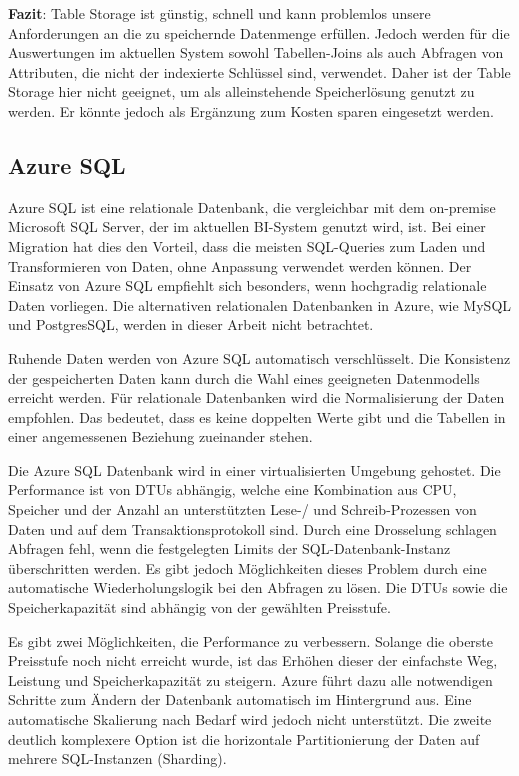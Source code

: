\textbf{Fazit}: Table Storage ist günstig, schnell und kann problemlos unsere Anforderungen an die zu speichernde Datenmenge erfüllen. Jedoch werden für die Auswertungen im aktuellen System sowohl Tabellen-Joins als auch Abfragen von Attributen, die nicht der indexierte Schlüssel sind, verwendet. Daher ist der Table Storage hier nicht geeignet, um als alleinstehende Speicherlösung genutzt zu werden. Er könnte jedoch als Ergänzung zum Kosten sparen eingesetzt werden. \cite[vgl.][]{reagan_web_2018}

\subsection{Azure SQL} \label{sec:grundlagen:azure_dienste:sql}
Azure SQL ist eine relationale Datenbank, die vergleichbar mit dem on-premise Microsoft SQL Server, der im aktuellen BI-System genutzt wird, ist. Bei einer Migration hat dies den Vorteil, dass die meisten SQL-Queries zum Laden und Transformieren von Daten, ohne Anpassung verwendet werden können. Der Einsatz von Azure SQL empfiehlt sich besonders, wenn hochgradig relationale Daten vorliegen. Die alternativen relationalen Datenbanken in Azure, wie MySQL und PostgresSQL, werden in dieser Arbeit nicht betrachtet.

Ruhende Daten werden von Azure SQL automatisch verschlüsselt. Die Konsistenz der gespeicherten Daten kann durch die Wahl eines geeigneten Datenmodells erreicht werden. Für relationale Datenbanken wird die Normalisierung der Daten empfohlen. Das bedeutet, dass es keine doppelten Werte gibt und die Tabellen in einer angemessenen Beziehung zueinander stehen.

Die Azure SQL Datenbank wird in einer virtualisierten Umgebung gehostet. Die Performance ist von DTUs abhängig, welche eine Kombination aus CPU, Speicher und der Anzahl an unterstützten Lese-/ und Schreib-Prozessen von Daten und auf dem Transaktionsprotokoll sind. Durch eine Drosselung schlagen Abfragen fehl, wenn die festgelegten Limits der SQL-Datenbank-Instanz überschritten werden. Es gibt jedoch Möglichkeiten dieses Problem durch eine automatische Wiederholungslogik bei den Abfragen zu lösen. Die DTUs sowie die Speicherkapazität sind abhängig von der gewählten Preisstufe.


Es gibt zwei Möglichkeiten, die Performance zu verbessern. Solange die oberste Preisstufe noch nicht erreicht wurde, ist das Erhöhen dieser der einfachste Weg, Leistung und Speicherkapazität zu steigern. Azure führt dazu alle notwendigen Schritte zum Ändern der Datenbank automatisch im Hintergrund aus. Eine automatische Skalierung nach Bedarf wird jedoch nicht unterstützt. Die zweite deutlich komplexere Option ist die horizontale Partitionierung der Daten auf mehrere SQL-Instanzen (Sharding). \cite{reagan_web_2018}

